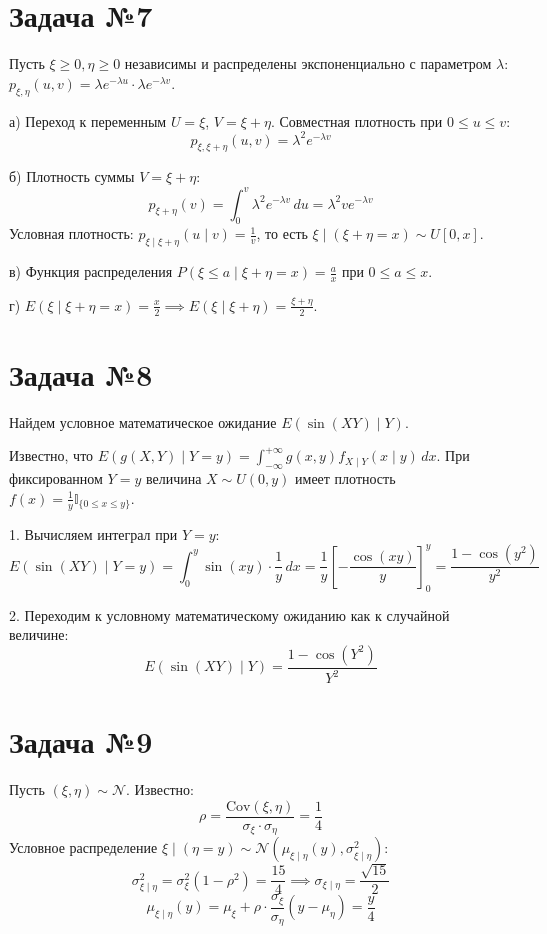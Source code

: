 \documentclass[12pt]{article}
\begin{document}
\bigskip
\section*{Задача №7}
Пусть $\xi \ge 0, \eta \ge 0$ независимы и распределены экспоненциально с параметром $\lambda$: $p_{\xi,\eta}(u,v) = \lambda e^{-\lambda u} \cdot \lambda e^{-\lambda v}$.

а) Переход к переменным $U = \xi$, $V = \xi + \eta$. Совместная плотность при $0 \le u \le v$:
\[
p_{\xi, \xi+\eta}(u,v) = \lambda^2 e^{-\lambda v}
\]

б) Плотность суммы $V = \xi + \eta$:
\[
p_{\xi+\eta}(v) = \int_0^v \lambda^2 e^{-\lambda v} \, du = \lambda^2 v e^{-\lambda v}
\]
Условная плотность: $p_{\xi \mid \xi+\eta}(u \mid v) = \frac{1}{v}$, то есть $\xi \mid (\xi+\eta=x) \sim U[0, x]$.

в) Функция распределения $P(\xi \le a \mid \xi+\eta = x) = \frac{a}{x}$ при $0 \le a \le x$.

г) $E(\xi \mid \xi+\eta = x) = \frac{x}{2} \implies E(\xi \mid \xi+\eta) = \frac{\xi+\eta}{2}$.

\bigskip
\section*{Задача №8}

Найдем условное математическое ожидание $E(\sin(XY) \mid Y)$.

Известно, что $E(g(X,Y) \mid Y=y) = \int_{-\infty}^{+\infty} g(x,y) f_{X \mid Y}(x \mid y) \, dx$.
При фиксированном $Y=y$ величина $X \sim U(0, y)$ имеет плотность $f(x) = \frac{1}{y} \mathbb{I}_{\{0 \le x \le y\}}$.

1. Вычисляем интеграл при $Y=y$:
\[
E(\sin(XY) \mid Y=y) = \int_{0}^{y} \sin(xy) \cdot \frac{1}{y} \, dx 
= \frac{1}{y} \left[ -\frac{\cos(xy)}{y} \right]_{0}^{y} 
= \frac{1 - \cos(y^2)}{y^2}
\]

2. Переходим к условному математическому ожиданию как к случайной величине:
\[
E(\sin(XY) \mid Y) = \frac{1 - \cos(Y^2)}{Y^2}
\]

\bigskip
\section*{Задача №9}

Пусть $(\xi, \eta) \sim \mathcal{N}$. Известно:
\[
\rho = \frac{\text{Cov}(\xi, \eta)}{\sigma_\xi \cdot \sigma_\eta} = \frac{1}{4}
\]
Условное распределение $\xi \mid (\eta = y) \sim \mathcal{N}(\mu_{\xi \mid \eta}(y), \sigma_{\xi \mid \eta}^2)$:
\[
\sigma_{\xi \mid \eta}^2 = \sigma_\xi^2 (1 - \rho^2) = \frac{15}{4} \implies \sigma_{\xi \mid \eta} = \frac{\sqrt{15}}{2}
\]
\[
\mu_{\xi \mid \eta}(y) = \mu_\xi + \rho \cdot \frac{\sigma_\xi}{\sigma_\eta} (y - \mu_\eta) = \frac{y}{4}
\]
\end{document}

